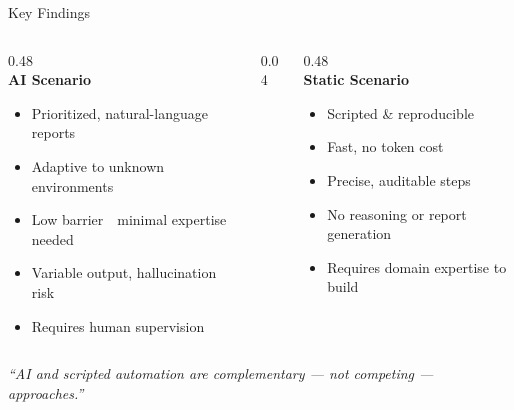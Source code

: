 
\begin{frame}{Key Findings}
  \begin{columns}[T]
    \begin{column}{0.48\textwidth}
      \centering
      {\Large\faRobot}\\[0.3em]
      \textbf{AI Scenario}
      \vspace{0.5em}
      \begin{itemize}
        \setlength\itemsep{0.3em}
        \item[\textcolor{green!60!black}{\faCheck}] Prioritized, natural-language reports
        \item[\textcolor{green!60!black}{\faCheck}] Adaptive to unknown environments
        \item[\textcolor{green!60!black}{\faCheck}] Low barrier~\textthreequartersemdash~minimal expertise needed
        \item[\textcolor{orange!80!black}{\faMinus}] Variable output, hallucination risk
        \item[\textcolor{orange!80!black}{\faMinus}] Requires human supervision
      \end{itemize}
    \end{column}
    \begin{column}{0.04\textwidth}\end{column}
    \begin{column}{0.48\textwidth}
      \centering
      {\Large\faCode}\\[0.3em]
      \textbf{Static Scenario}
      \vspace{0.5em}
      \begin{itemize}
        \setlength\itemsep{0.3em}
        \item[\textcolor{green!60!black}{\faCheck}] Scripted \& reproducible
        \item[\textcolor{green!60!black}{\faCheck}] Fast, no token cost
        \item[\textcolor{green!60!black}{\faCheck}] Precise, auditable steps
        \item[\textcolor{orange!80!black}{\faMinus}] No reasoning or report generation
        \item[\textcolor{orange!80!black}{\faMinus}] Requires domain expertise to build
      \end{itemize}
    \end{column}
  \end{columns}
  \vspace{0.9em}
  \begin{center}
    \textit{``AI and scripted automation are complementary — not competing — approaches.''}
  \end{center}
\end{frame}
